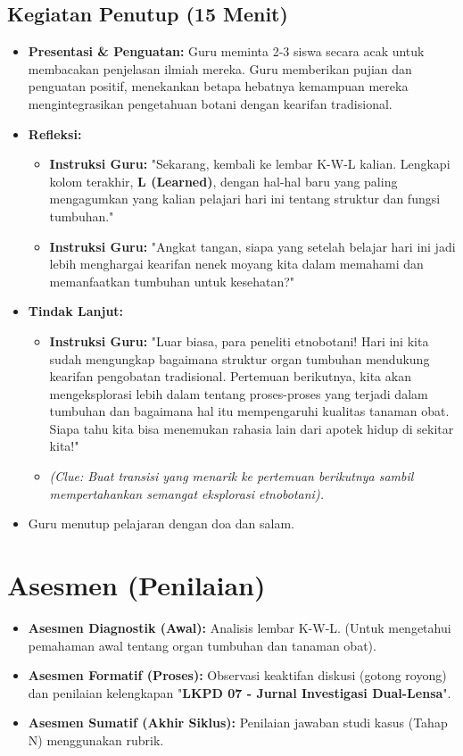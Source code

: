 \documentclass[a4paper,12pt]{article}
\begin{document}
\subsection{Kegiatan Penutup (15 Menit)}
\begin{itemize}
\item \textbf{Presentasi \& Penguatan:} Guru meminta 2-3 siswa secara acak untuk membacakan penjelasan ilmiah mereka. Guru memberikan pujian dan penguatan positif, menekankan betapa hebatnya kemampuan mereka mengintegrasikan pengetahuan botani dengan kearifan tradisional.
\item \textbf{Refleksi:}
    \begin{itemize}
    \item \textbf{Instruksi Guru:} "Sekarang, kembali ke lembar K-W-L kalian. Lengkapi kolom terakhir, \textbf{L (Learned)}, dengan hal-hal baru yang paling mengagumkan yang kalian pelajari hari ini tentang struktur dan fungsi tumbuhan."
    \item \textbf{Instruksi Guru:} "Angkat tangan, siapa yang setelah belajar hari ini jadi lebih menghargai kearifan nenek moyang kita dalam memahami dan memanfaatkan tumbuhan untuk kesehatan?"
    \end{itemize}
\item \textbf{Tindak Lanjut:}
    \begin{itemize}
    \item \textbf{Instruksi Guru:} "Luar biasa, para peneliti etnobotani! Hari ini kita sudah mengungkap bagaimana struktur organ tumbuhan mendukung kearifan pengobatan tradisional. Pertemuan berikutnya, kita akan mengeksplorasi lebih dalam tentang proses-proses yang terjadi dalam tumbuhan dan bagaimana hal itu mempengaruhi kualitas tanaman obat. Siapa tahu kita bisa menemukan rahasia lain dari apotek hidup di sekitar kita!"
    \item \textit{(Clue: Buat transisi yang menarik ke pertemuan berikutnya sambil mempertahankan semangat eksplorasi etnobotani).}
    \end{itemize}
\item Guru menutup pelajaran dengan doa dan salam.
\end{itemize}

\section{Asesmen (Penilaian)}

\begin{itemize}
\item \textbf{Asesmen Diagnostik (Awal):} Analisis lembar K-W-L. (Untuk mengetahui pemahaman awal tentang organ tumbuhan dan tanaman obat).
\item \textbf{Asesmen Formatif (Proses):} Observasi keaktifan diskusi (gotong royong) dan penilaian kelengkapan "\textbf{LKPD 07 - Jurnal Investigasi Dual-Lensa}".
\item \textbf{Asesmen Sumatif (Akhir Siklus):} Penilaian jawaban studi kasus (Tahap N) menggunakan rubrik.
\end{itemize}
\end{document}
